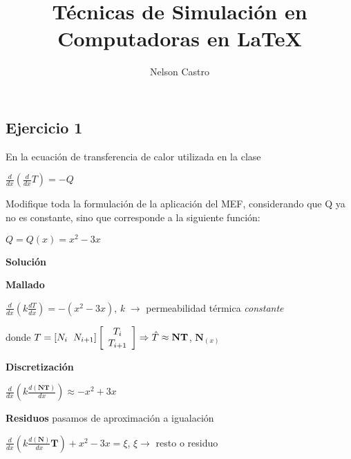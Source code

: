 \documentclass[12pt]{report}
\title{Técnicas de Simulación en Computadoras en \LaTeX}
\author{Nelson Castro}
\begin{document}
        \maketitle
        \newpage
        \subsection*{\bfseries \large Ejercicio 1}
        En la ecuación de transferencia de calor utilizada en la clase
        \begin{center}
            $\displaystyle \frac{d}{dx} \left( \frac{d}{dx}T \right) = -Q$
        \end{center}
        Modifique toda la formulación de la aplicación del MEF, considerando que Q ya no es constante, sino que corresponde a la siguiente función:
        \begin{center}
            $\displaystyle Q = Q(x) = x^2 -3x$
        \end{center}
        \textbf{Solución}
        
        \centering \textbf{Mallado}
        \begin{center}
            $\displaystyle \frac{d}{dx} \left( k\frac{dT}{dx} \right) = -(x^2 -3x)$, \hspace{0.7cm} \textit{k} $\rightarrow$ permeabilidad térmica \textit{constante}
        \end{center}

        donde $\displaystyle T=[N_i \hspace{0.2cm} N_{i+1}]\left[\begin{array}{c} T_i \\ T_{i+1} \end{array}\right] \Rightarrow \hat{T} \approx \textbf{NT}$, \hspace{0.7cm} $\displaystyle \textbf{N}_{(x)}$
        
        \textbf{Discretización}
        \begin{center}
            $\displaystyle \frac{d}{dx} \left( k\frac{d(\textbf{NT})}{dx} \right) \approx -x^2 +3x$
        \end{center}

        \textbf{Residuos} pasamos de aproximación a igualación
        \begin{center}
            $\displaystyle \frac{d}{dx} \left( k\frac{d(\textbf{N})}{dx} \textbf{T}\right) + x^2 -3x = \xi$, \hspace{0.7cm} $\xi \rightarrow$ resto o residuo 
        \end{center}
\end{document}
